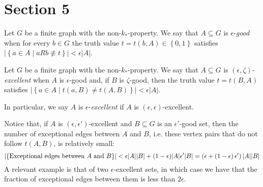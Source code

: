 \section{Section 5} \label{sec:section_5}

        Let $G$ be a finite graph with the non-$k_*$-property.
        We say that $A \subseteq G$ is $\epsilon$-\emph{good} when for every $b \in G$ the truth value
        $t = t(b, A) \in \left\{ 0, 1 \right\}$ satisfies $|\left\{ a\in A \mid aRb \not\equiv t \right\}| < \epsilon |A|$.

        Let $G$ be a finite graph with the non-$k_*$-property.
        We say that $A \subseteq G$ is $(\epsilon, \zeta)$-\emph{excellent} when $A$ is $\epsilon$-good and, if $B$ is
        $\zeta$-good, then the truth value $t = t(B,A)$ satisfies $|\left\{ a \in A \mid t(a,B) \neq t(A,B) \right\}| < \epsilon |A|$.

        In particular, we say $A$ is $\epsilon$-\emph{excellent} if $A$ is $(\epsilon, \epsilon)$-excellent.

    \begin{remark}\label{remark_excellence_imply_little_exceptions}
        Notice that, if $A$ is $(\epsilon, \epsilon')$-excellent and $B \subseteq G$ is an $\epsilon'$-good set, then
        the number of exceptional edges between $A$ and $B$, i.e. these vertex pairs that do not follow $t(A,B)$, is
        relatively small:
        $$
            \left| \left\{ \text{Exceptional edges between } A \text{ and } B \right\} \right| <
                \epsilon |A| |B| + (1- \epsilon) |A| \epsilon' |B| = \left( \epsilon + \left( 1-\epsilon \right) \epsilon' \right) |A| |B|
        $$
        A relevant example is that of two $\epsilon$-excellent sets, in which case we have that the fraction
        of exceptional edges between them is less than $2\epsilon$.
    \end{remark}

